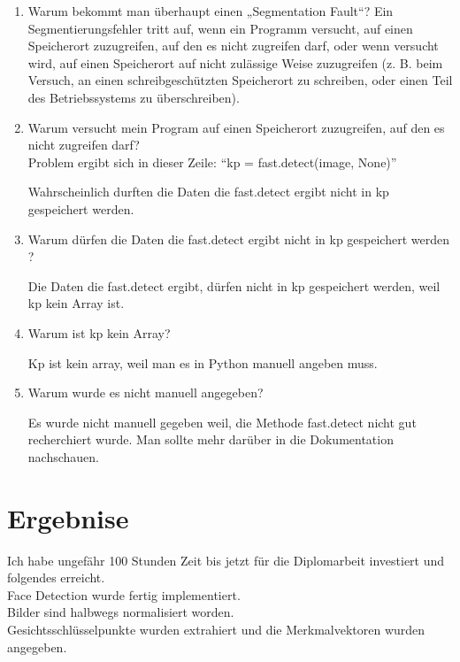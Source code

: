 \begin{enumerate}
	\item 	Warum bekommt man überhaupt einen „Segmentation Fault“? 
	Ein Segmentierungsfehler tritt auf, wenn ein Programm versucht, auf einen Speicherort zuzugreifen, auf den es nicht zugreifen darf, oder wenn versucht wird, auf einen Speicherort auf nicht zulässige Weise zuzugreifen (z. B. beim Versuch, an einen schreibgeschützten Speicherort zu schreiben, oder einen Teil des Betriebssystems zu überschreiben).\\
	\item 	Warum versucht mein Program auf einen Speicherort zuzugreifen, auf den es nicht zugreifen darf?\\
	
	Problem ergibt sich in dieser Zeile: 
	“kp = fast.detect(image, None)”
	
	Wahrscheinlich durften die Daten die fast.detect ergibt nicht in kp gespeichert werden. 
	
	\item	Warum dürfen die Daten die fast.detect ergibt nicht in kp gespeichert werden ? 
	
	Die Daten die fast.detect ergibt, dürfen nicht in kp gespeichert werden, weil kp kein Array ist. 
	
	\item	Warum ist kp kein Array? 
	
	Kp ist kein array, weil man es in Python  manuell angeben muss.
	
	\item Warum wurde es nicht manuell angegeben? 
	
	Es wurde nicht manuell gegeben weil, die Methode fast.detect nicht gut recherchiert wurde. Man sollte mehr darüber in die Dokumentation nachschauen.
 
	
\end{enumerate}
\section{Ergebnise}
Ich habe ungefähr 100 Stunden Zeit bis jetzt für die Diplomarbeit investiert und folgendes erreicht.\\ 
Face Detection wurde fertig implementiert.\\
Bilder sind halbwegs normalisiert worden. \\
Gesichtsschlüsselpunkte wurden extrahiert und die Merkmalvektoren wurden angegeben.  \\


